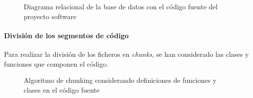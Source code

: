 \begin{figure}[h]
  \centering
  \caption{Diagrama relacional de la base de datos con el código fuente del proyecto software}
  \label{fig:relacional}
\end{figure}

\paragraph{División de los segmentos de código}
Para realizar la división de los ficheros en \textit{chunks}, se han considerado las clases y funciones que componen el código. 

\begin{figure}[h]
  \centering
  \caption{Algoritmo de chunking considerando definiciones de funciones y clases en el código fuente}
  \label{fig:chunks}
\end{figure}









